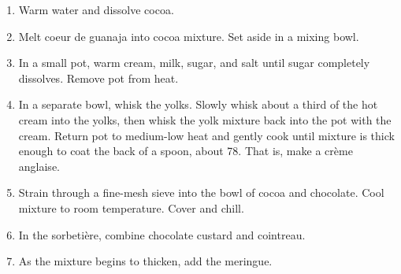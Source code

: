 

\begin{ingredients}
\end{ingredients}


\begin{recipe}
  \begin{enumerate}

  \item Warm water and dissolve cocoa.
    
  \item Melt coeur de guanaja into cocoa mixture.  Set aside in a mixing bowl.

  \item In a small pot, warm cream, milk, sugar, and salt until sugar
    completely dissolves.  Remove pot from heat.

  \item In a separate bowl, whisk the yolks.  Slowly whisk about a
    third of the hot cream into the yolks, then whisk the yolk mixture
    back into the pot with the cream. Return pot to medium-low heat
    and gently cook until mixture is thick enough to coat the back of
    a spoon, about 78\degreeC.  That is, make a crème anglaise.

  \item Strain through a fine-mesh sieve into the bowl of cocoa and
    chocolate. Cool mixture to room temperature. Cover and chill.
    
  \item In the sorbetière, combine chocolate custard and cointreau.

  \item As the mixture begins to thicken, add the meringue.

  \end{enumerate}
\end{recipe}

